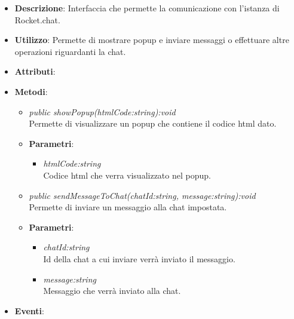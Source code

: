\begin{itemize}
\item \textbf{Descrizione}: Interfaccia che permette la comunicazione con l'istanza di Rocket.chat.
\item \textbf{Utilizzo}: Permette di mostrare popup e inviare messaggi o effettuare altre operazioni riguardanti la chat.
\item \textbf{Attributi}: 
\item \textbf{Metodi}:
	\begin{itemize}
	\item \textit{public showPopup(htmlCode:string):void}\\
	Permette di visualizzare un popup che contiene il codice html dato.
			\item{\textbf{Parametri}: \begin{itemize}
			\item \textit{htmlCode:string}\\
				Codice html che verra visualizzato nel popup.
			\end{itemize}}
			\item \textit{public sendMessageToChat(chatId:string, message:string):void}\\
			Permette di inviare un messaggio alla chat impostata.
					\item{\textbf{Parametri}: \begin{itemize}
\item \textit{chatId:string}\\
	Id della chat a cui inviare verrà inviato il messaggio.
\item \textit{message:string}\\
	Messaggio che verrà inviato alla chat.
\end{itemize}}
	\end{itemize}
\item \textbf{Eventi}:
\end{itemize}